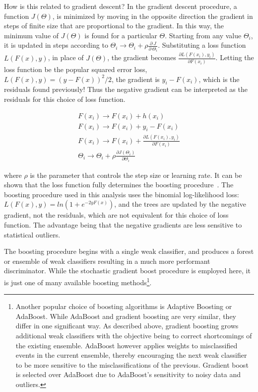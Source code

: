 How is this related to gradient descent? In the gradient descent procedure, a function $J(\Theta)$, is minimized by moving in the opposite direction the gradient in steps
of finite size that are proportional to the gradient. In this way, the minimum value of $J(\Theta)$ is found for a particular $\Theta$. Starting from any value $\Theta_{i}$,
it is updated in steps according to $\Theta_{i} \rightarrow \Theta_{i} + \rho\frac{\partial~J}{\partial~\Theta_{i}}$. 
Substituting a loss function $L(F(x),y)$, in place of $J(\Theta)$, the gradient becomes $\frac{\partial L(F(x_{i}),y_{i})}{\partial F(x_{i})}$. Letting the loss function be the popular squared error loss,
$L(F(x),y) = (y-F(x))^{2}/2$, the gradient is $y_{i}-F(x_{i})$, which is the residuals found previously! Thus the negative gradient can be interpreted as the residuals for this
choice of loss function. 

\begin{equation}
\begin{aligned}
\label{eqn:residual1}
F(x_{i}) \rightarrow F(x_{i}) + h(x_{i}) \\ F(x_{i}) \rightarrow F(x_{i}) + y_{i} - F(x_{i}) \\ F(x_{i}) \rightarrow F(x_{i}) + \frac{\partial L(F(x_{i}),y_{i})}{\partial F(x_{i})} \\ \Theta_{i} \rightarrow \Theta_{i} + \rho\frac{\partial J(\Theta_{i})}{\partial \Theta_{i}}
\end{aligned} 
\end{equation}

\noindent where $\rho$ is the parameter that controls the step size or learning rate. It can be shown that the loss function fully determines the boosting procedure~\cite{tmva}.
The boosting procedure used in this analysis uses the binomial log-likelihood loss: $L(F(x),y) = ln(1+e^{-2yF(x)})$, and the trees are updated by the negative gradient,
not the residuals, which are not equivalent for this choice of loss function. The advantage being that the negative gradients are less sensitive to statistical outliers. 

The boosting procedure begins with a single weak classifier, and produces a forest or ensemble of weak classifiers resulting in a much more performant discriminator.
While the stochastic gradient boost procedure is employed here, it is just one of many available boosting methods\footnote{Another popular choice of boosting algorithms
is Adaptive Boosting or AdaBoost. While AdaBoost and
gradient boosting are very similar, they differ in one significant way. As described above, gradient boosting grows additional weak classifiers with the objective being to correct
shortcomings of the existing ensemble. AdaBoost however applies weights to misclassified events in the current ensemble, thereby encouraging the next weak classifier to be more sensitive
to the misclassifications of the previous. Gradient boost is selected over AdaBoost due to AdaBoost's sensitivity to noisy data and outliers.}.

